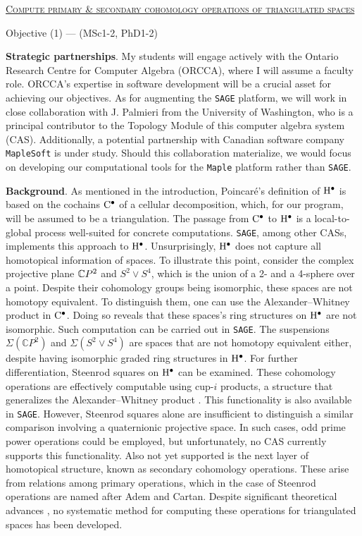 
\smallskip
{\centering \underline{\textsc{Compute primary \& secondary cohomology operations of triangulated spaces}}\par}
{\centering Objective (1) \hspace*{2cm} --- \hspace*{2cm} (MSc1-2, PhD1-2)\par}

\smallskip\textbf{Strategic partnerships}.
My students will engage actively with the Ontario Research Centre for Computer Algebra (ORCCA), where I will assume a faculty role.
ORCCA's expertise in software development will be a crucial asset for achieving our objectives.
As for augmenting the \texttt{SAGE} platform, we will work in close collaboration with J. Palmieri from the University of Washington, who is a principal contributor to the Topology Module of this computer algebra system (CAS).
Additionally, a potential partnership with Canadian software company \texttt{MapleSoft} is under study.
Should this collaboration materialize, we would focus on developing our computational tools for the \texttt{Maple} platform rather than \texttt{SAGE}.

\smallskip\textbf{Background}.
As mentioned in the introduction, Poincar\'e's definition of $\mathrm{H}^\bullet$ is based on the cochains $\mathrm{C}^\bullet$ of a cellular decomposition, which, for our program, will be assumed to be a triangulation.
The passage from $\mathrm{C}^\bullet$ to $\mathrm{H}^\bullet$ is a local-to-global process well-suited for concrete computations.
\texttt{SAGE}, among other CASs, implements this approach to $\mathrm{H}^\bullet$.
Unsurprisingly, $\mathrm{H}^\bullet$ does not capture all homotopical information of spaces.
To illustrate this point, consider the complex projective plane $\mathbb{C} P^2$ and $S^2 \vee S^4$, which is the union of a 2- and a 4-sphere over a point.
Despite their cohomology groups being isomorphic, these spaces are not homotopy equivalent.
To distinguish them, one can use the Alexander--Whitney product in $\mathrm{C}^\bullet$.
Doing so reveals that these spaces's ring structures on $\mathrm{H}^\bullet$ are not isomorphic.
Such computation can be carried out in \texttt{SAGE}.
The suspensions $\Sigma(\mathbb{C} P^2)$ and $\Sigma(S^2 \vee S^4)$ are spaces that are not homotopy equivalent either, despite having isomorphic graded ring structures in $\mathrm{H}^\bullet$.
For further differentiation, Steenrod squares on $\mathrm{H}^\bullet$ can be examined.
These cohomology operations are effectively computable using cup-$i$ products, a structure that generalizes the Alexander--Whitney product \cite{steenrod1947products}.
This functionality is also available in \texttt{SAGE}.
However, Steenrod squares alone are insufficient to distinguish a similar comparison involving a quaternionic projective space.
In such cases, odd prime power operations could be employed, but unfortunately, no CAS currently supports this functionality.
Also not yet supported is the next layer of homotopical structure, known as secondary cohomology operations.
These arise from relations among primary operations, which in the case of Steenrod operations are named after Adem and Cartan.
Despite significant theoretical advances \cite{baues2006secondary}, no systematic method for computing these operations for triangulated spaces has been developed.

